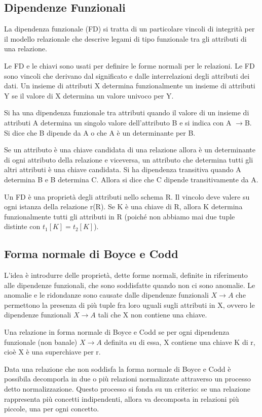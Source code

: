 \documentclass{article}
\begin{document}
\subsection{Dipendenze Funzionali} 
La dipendenza funzionale (FD) si tratta di un particolare vincoli di integrità per il modello relazionale che descrive legami di tipo funzionale tra gli attributi di una relazione. 

\noindent Le FD e le chiavi sono usati per definire le forme normali per le relazioni. Le FD sono vincoli che derivano dal significato e dalle interrelazioni degli attributi dei dati. Un insieme di attributi X determina funzionalmente un insieme di attributi Y se il valore di X determina un valore univoco per Y. 

\noindent Si ha una dipendenza funzionale tra attributi quando il valore di un insieme di attributi A determina un singolo valore dell'attributo B e si indica con A $\rightarrow$B. Si dice che B dipende da A o che A è un determinante per B.

\noindent Se un attributo è una chiave candidata di una relazione allora è un determinante di ogni attributo della relazione e viceversa, un attributo che determina tutti gli altri attributi è una chiave candidata. Si ha dipendenza transitiva quando A determina B e B determina C. Allora si dice che C dipende transitivamente da A.

\noindent Un FD è una proprietà degli attributi nello schema R. Il vincolo deve valere su ogni istanza della relazione r(R). Se K è una chiave di R, allora K determina funzionalmente tutti gli attributi in R (poiché non abbiamo mai due tuple distinte con $t_1[K]=t_2[K]$).
\subsection{Forma normale di Boyce e Codd}
L'idea è introdurre delle proprietà, dette forme normali, definite in riferimento alle dipendenze funzionali, che sono soddisfatte quando non ci sono anomalie. Le anomalie e le ridondanze sono causate dalle dipendenze funzionali $X\rightarrow A$ che permettono la presenza di più tuple fra loro uguali sugli attributi in X, ovvero le dipendenze funzionali $X\rightarrow A$ tali che X non contiene una chiave.

\noindent Una relazione in forma normale di Boyce e Codd se per ogni dipendenza funzionale (non banale) $X\rightarrow A$ definita su di essa, X contiene una chiave K di r, cioè X è una superchiave per r.

\noindent Data una relazione che non soddisfa la forma normale di Boyce e Codd è possibila decomporla in due o più relazioni normalizzate attraverso un processo detto normalizzazione. Questo processo si fonda su un criterio: se una relazione rappresenta più concetti indipendenti, allora va decomposta in relazioni più piccole, una per ogni concetto. 


\end{document}
